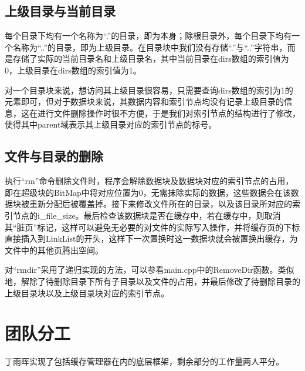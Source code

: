 \subsection{上级目录与当前目录}
每个目录下均有一个名称为“.”的目录，即为本身；除根目录外，每个目录下均有一个名称为“..”的目录，即为上级目录。在目录块中我们没有存储“.”与“..”字符串，而是存储了实际的当前目录名和上级目录名，其中当前目录在dirs数组的索引值为0，上级目录在dirs数组的索引值为1。

对一个目录块来说，想访问其上级目录很容易，只需要查询dirs数组的索引为1的元素即可，但对于数据块来说，其数据内容和索引节点均没有记录上级目录的信息，这在进行文件删除操作时很不方便，于是我们对索引节点的结构进行了修改，使得其中parent域表示其上级目录对应的索引节点的标号。

\subsection{文件与目录的删除}
执行“rm”命令删除文件时，程序会解除数据块及数据块对应的索引节点的占用，即在超级块的BitMap中将对应位置为0，无需抹除实际的数据，这些数据会在该数据块被重新分配后被覆盖掉。接下来修改文件所在的目录，以及该目录所对应的索引节点的i\_file\_size。最后检查该数据块是否在缓存中，若在缓存中，则取消其“脏页”标记，这样可以避免无必要的对文件的实际写入操作，并将缓存页的下标直接插入到LinkList的开头，这样下一次置换时这一数据块就会被置换出缓存，为文件中的其他页腾出空间。

对“rmdir”采用了递归实现的方法，可以参看main.cpp中的RemoveDir函数。类似地，解除了待删除目录下所有子目录以及文件的占用，并最后修改了待删除目录的上级目录块以及上级目录块对应的索引节点。


\section{团队分工}
丁雨晖实现了包括缓存管理器在内的底层框架，剩余部分的工作量两人平分。